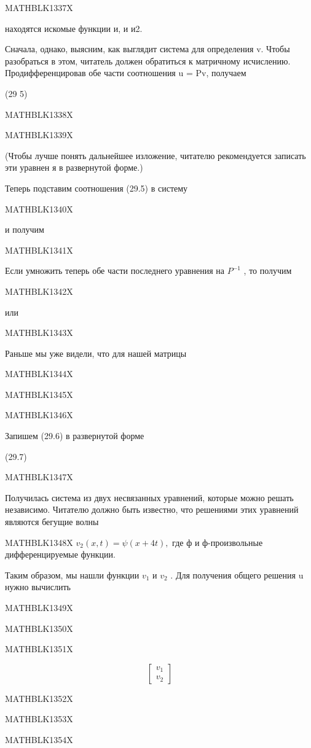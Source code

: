 \documentclass[
]{article}
\begin{document}
MATHBLK1337X

находятся искомые функции и, и и2.

Сначала, однако, выясним, как выглядит система для определения v. Чтобы
разобраться в этом, читатель должен обратиться к матричному исчислению.
Продифференцировав обе части соотношения u = Pv, получаем

(29 5)

MATHBLK1338X

MATHBLK1339X

(Чтобы лучше понять дальнейшее изложение, читателю рекомендуется
записать эти уравнен я в развернутой форме.)

Теперь подставим соотношения (29.5) в систему

MATHBLK1340X

и получим

MATHBLK1341X

Если умножить теперь обе части последнего уравнения на \(P^{-1}\) , то
получим

MATHBLK1342X

или

MATHBLK1343X

Раньше мы уже видели, что для нашей матрицы

MATHBLK1344X

MATHBLK1345X

MATHBLK1346X

Запишем (29.6) в развернутой форме

(29.7)

MATHBLK1347X

Получилась система из двух несвязанных уравнений, которые можно решать
независимо. Читателю должно быть известно, что решениями этих уравнений
являются бегущие волны

MATHBLK1348X \(v_2(x, t) = \psi(x+4t),\) где ф и ф-произвольные
дифференцируемые функции.

Таким образом, мы нашли функции \(v_1\) и \(v_2\) . Для получения общего
решения u нужно вычислить

MATHBLK1349X

MATHBLK1350X

MATHBLK1351X

\[
\begin{bmatrix} v_1 \\ v_2 \end{bmatrix}
\]

MATHBLK1352X

MATHBLK1353X

MATHBLK1354X
\end{document}
